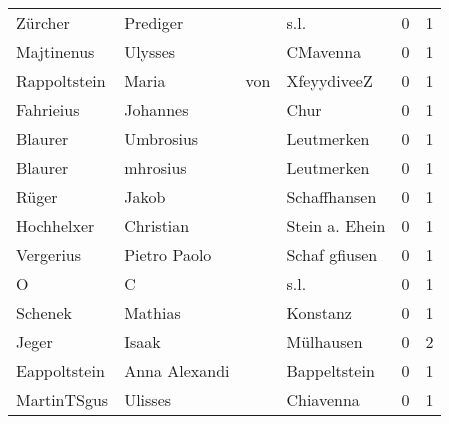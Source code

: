 \begin{tabular}{llllrr}
                  Zürcher &                           Prediger &             &                                        s.l. &          0 &         1 \\
               Majtinenus &                            Ulysses &             &                                    CMavenna &          0 &         1 \\
             Rappoltstein &                              Maria &         von &                                 XfeyydiveeZ &          0 &         1 \\
                Fahrieius &                           Johannes &             &                                        Chur &          0 &         1 \\
                  Blaurer &                          Umbrosius &             &                                  Leutmerken &          0 &         1 \\
                  Blaurer &                           mhrosius &             &                                  Leutmerken &          0 &         1 \\
                    Rüger &                              Jakob &             &                                Schaffhansen &          0 &         1 \\
               Hochhelxer &                          Christian &             &                              Stein a. Ehein &          0 &         1 \\
                Vergerius &                       Pietro Paolo &             &                               Schaf gfiusen &          0 &         1 \\
                        O &                                  C &             &                                        s.l. &          0 &         1 \\
                  Schenek &                            Mathias &             &                                    Konstanz &          0 &         1 \\
                    Jeger &                              Isaak &             &                                   Mülhausen &          0 &         2 \\
             Eappoltstein &                      Anna Alexandi &             &                                Bappeltstein &          0 &         1 \\
              MartinTSgus &                            Ulisses &             &                                   Chiavenna &          0 &         1 \\

\end{tabular}
